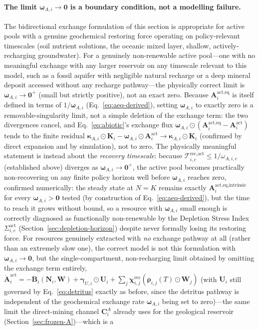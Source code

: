 \documentclass[twocolumn,10pt]{article}
\begin{document}
\paragraph{The limit $\boldsymbol\omega_{A,i}\to\mathbf 0$ is a boundary condition, not a modelling failure.} The bidirectional exchange formulation of this section is appropriate for active pools with a genuine geochemical restoring force operating on policy-relevant timescales (soil nutrient solutions, the oceanic mixed layer, shallow, actively-recharging groundwater). For a genuinely non-renewable active pool---one with no meaningful exchange with any larger reservoir on any timescale relevant to this model, such as a fossil aquifer with negligible natural recharge or a deep mineral deposit accessed without any recharge pathway---the physically correct limit is $\boldsymbol\omega_{A,i}\to\mathbf 0^+$ (small but strictly positive), not an exact zero. Because $\mathbf A^{\text{act},\text{eq}}_i$ is itself defined in terms of $1/\boldsymbol\omega_{A,i}$ (Eq.~\eqref{eq:aeq-derived}), setting $\boldsymbol\omega_{A,i}$ to exactly zero is a removable-singularity limit, not a simple deletion of the exchange term: the two divergences cancel, and Eq.~\eqref{eq:abiotic}'s exchange flux $\boldsymbol\omega_{A,i}\odot(\mathbf A^{\text{act},\text{eq}}_i-\mathbf A^{\text{act}}_i)$ tends to the finite residual $\boldsymbol\kappa_{A,i}\odot\mathbf K_i-\boldsymbol\omega_{A,i}\odot\mathbf A^{\text{act}}_i\to\boldsymbol\kappa_{A,i}\odot\mathbf K_i$ (confirmed by direct expansion and by simulation), not to zero. The physically meaningful statement is instead about the \emph{recovery timescale}: because $\mathcal T^{\text{rec},\text{act}}_{i,c}\le1/\omega_{A,i,c}$ (established above) diverges as $\boldsymbol\omega_{A,i}\to\mathbf 0^+$, the active pool becomes practically non-recovering on any finite policy horizon well before $\boldsymbol\omega_{A,i}$ reaches zero, confirmed numerically: the steady state at $N=K$ remains exactly $\mathbf A^{\text{act},\text{eq,intrinsic}}_i$ for every $\boldsymbol\omega_{A,i}>\mathbf 0$ tested (by construction of Eq.~\eqref{eq:aeq-derived}), but the time to reach it grows without bound, so a resource with $\boldsymbol\omega_{A,i}$ small enough is correctly diagnosed as functionally non-renewable by the Depletion Stress Index $\Sigma^{\text{act}}_{i,c}$ (Section~\ref{sec:depletion-horizon}) despite never formally losing its restoring force. For resources genuinely extracted with \emph{no} exchange pathway at all (rather than an extremely slow one), the correct model is not this formulation with $\boldsymbol\omega_{A,i}\to\mathbf 0$, but the single-compartment, non-recharging limit obtained by omitting the exchange term entirely, $\dot{\mathbf A}^{\text{act}}_i=-\mathbf B_i(\mathbf N_i,\mathbf W)+\boldsymbol\gamma_{U,i}\odot\mathbf U_i+\sum_j\boldsymbol\chi^{\text{rec}}_{i,j}(\boldsymbol\rho_{i,j}(T)\odot\mathbf W_j)$ (with $\mathbf U_i$ still governed by Eq.~\eqref{eq:detritus} exactly as before, since the detritus pathway is independent of the geochemical exchange rate $\boldsymbol\omega_{A,i}$ being set to zero)---the same limit the direct-mining channel $\mathbf C^A_i$ already uses for the geological reservoir (Section~\ref{sec:frozen-A})---which is a 
\end{document}
